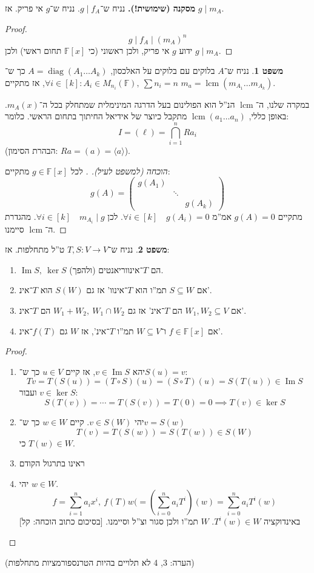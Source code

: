 \documentclass[a4paper]{article}
\newcommand\ml    {\ell}
\newcommand\ra    {\rangle}
\newcommand\la    {\langle}
\DeclareMathOperator\Img   {Im}
\DeclareMathOperator{\diag}    {diag}
\DeclareMathOperator{\lcm}     {lcm}
\newcommand\F         {\mathbb{F}}
\newcommand\co        {\colon}
\newcommand\pms[1]    {\begin{pmatrix}
		#1
\end{pmatrix}}
\newcommand\cl [1]    {\left ( #1 \right )}
\theoremstyle{definition}
\newtheorem{Theorem}{משפט}
\newcommand\theo  [1] {\begin{Theorem}#1\end{Theorem}}
\begin{document}
	\textbf{מסקנה (שימושית!). }נניח ש־$g \mid f_A$. נניח ש־$g$ אי פריק. אז $g \mid m_A$. \begin{proof}
		\[ g \mid f_A \mid (m_A)^{n} \]
		ידוע $g$ אי פריק, ולכן ראשוני (כי $\F[x]$ תחום ראשי) ולכן $g \mid m_A$. 
	\end{proof}
	\theo{נניח ש־$A$ בלוקים עם בלוקים על האלכסון, $A = \diag(A_1 \dots A_k)$ כך ש־$\forall i \in [k] \co A_i \in M_{n_i}(\F), \ \sum n_i = n$, אז מתקיים $m_a = \lcm(m_{A_1} \dots m_{A_k})$. }
	
	במקרה שלנו, ה־$\lcm$ הנ''ל הוא הפולינום בעל הדרגה המינימלית שמתחלק בכל ה־$m_A(x)$. באופן כללי, $\lcm(a_1 \dots a_n)$ מתקבל כיוצר של אידיאל החיתוך בתחום הראשי. כלומר: 
	\[ I = (\ml) = \bigcap_{i = 1}^{n}R a_i \]
	(הבהרת הסימון: $ Ra = (a) = \la a \ra $). 
	\begin{proof}[הוכחה (למשפט לעיל). ]
		לכל $g \in \F[x]$ מתקיים: 
		\[ g(A) = \pms{g(A_1) & & \\ & \ddots & \\ && g(A_k)} \]
		מתקיים $g(A) = 0$ אמ''מ $\forall i \in [k] \quad g(A_i) =0$. לכן $\forall i \in [k] \quad m_{A_i} \mid g$. מהגדרת ה־$\lcm$ סיימנו. 
	\end{proof}
	
	\theo{נניח ש־$T, S \co V \to V$ ט''ל מתחלפות. אז: 
		\begin{enumerate}
			\item $\Img S, \ \ker S$ הם $T$־אינווריאנטים (ולהפך). 
			\item אם $S \subseteq W$ תמ''ו הוא $T$־אינוו' אז גם $S(W)$ הוא $T$־אינ'. 
			\item אם $W_1, W_2 \subseteq V$ הם $T$־אינ' אז גם $W_1 + W_2, \ W_1 \cap W_2$ הם $T$־אינ'. 
			\item אם $f \in \F[x]$ ו־$W \subseteq V$ תמ''ו $T$־אינ', אז $W$ גם $f(T)$־אינ'. 
	\end{enumerate}}
	\begin{proof}\,
		\begin{enumerate}
			\item יהא $v \in \Img S$, אז קיים $u \in V$ כך ש־$S(u) = v$: 
			\[ Tv = T(S(u)) = (T \circ S)(u) = (S \circ T)(u) = S(T(u)) \in \Img S \]
			ועבור $v \in \ker S$: 
			\[ S(T(v)) = \cdots = T(S(v)) = T(0) = 0 \implies T(v) \in \ker S \]
			\item יהי $v \in S(W)$. קיים $w \in W$ כך ש־$v = S(w)$
			\[ T(v) = T(S(w)) = S(T(w)) \in S(W) \]
			כי $T(w) \in W$. 
			\item ראינו בתרגול הקודם
			\item יהי $w \in W$. 
			\[ f = \sum_{i = 1}^{n}a_ix^{i}, \ f(T)w( = \cl{\sum_{i = 0}^{n}a_iT^{i}}(w) = \sum_{i = 0}^{n}a_iT^{i}(w) \]
			באינדוקציה $T^{i}(w) \in W$. $W$ תמ''ו ולכן סגור וצ''ל וסיימנו. [בסיכום כתוב הוכחה: קל]
		\end{enumerate}
	\end{proof}
	(הערה: 3, 4 לא תלויים בהיות הטרנספורמציות מתחלפות)
	
\end{document}
